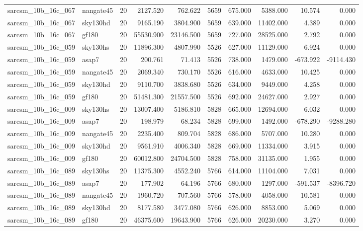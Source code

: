\begin{tabular}{llrrrrrrrr}
sarcsm\_10b\_16c\_067 & nangate45 & 20 & 2127.520 & 762.622 & 5659 & 675.000 & 5388.000 & 10.574 & 0.000 \\
sarcsm\_10b\_16c\_067 & sky130hd & 20 & 9165.190 & 3804.900 & 5659 & 639.000 & 11402.000 & 4.389 & 0.000 \\
sarcsm\_10b\_16c\_067 & gf180 & 20 & 55530.900 & 23146.500 & 5659 & 727.000 & 28525.000 & 2.792 & 0.000 \\
sarcsm\_10b\_16c\_059 & sky130hs & 20 & 11896.300 & 4807.990 & 5526 & 627.000 & 11129.000 & 6.924 & 0.000 \\
sarcsm\_10b\_16c\_059 & asap7 & 20 & 200.761 & 71.413 & 5526 & 738.000 & 1479.000 & -673.922 & -9114.430 \\
sarcsm\_10b\_16c\_059 & nangate45 & 20 & 2069.340 & 730.170 & 5526 & 616.000 & 4633.000 & 10.425 & 0.000 \\
sarcsm\_10b\_16c\_059 & sky130hd & 20 & 9110.700 & 3838.680 & 5526 & 634.000 & 9449.000 & 4.258 & 0.000 \\
sarcsm\_10b\_16c\_059 & gf180 & 20 & 51481.300 & 21557.500 & 5526 & 692.000 & 24627.000 & 2.927 & 0.000 \\
sarcsm\_10b\_16c\_009 & sky130hs & 20 & 13007.400 & 5186.810 & 5828 & 665.000 & 12694.000 & 6.032 & 0.000 \\
sarcsm\_10b\_16c\_009 & asap7 & 20 & 198.979 & 68.234 & 5828 & 699.000 & 1492.000 & -678.290 & -9288.280 \\
sarcsm\_10b\_16c\_009 & nangate45 & 20 & 2235.400 & 809.704 & 5828 & 686.000 & 5707.000 & 10.280 & 0.000 \\
sarcsm\_10b\_16c\_009 & sky130hd & 20 & 9561.910 & 4006.340 & 5828 & 669.000 & 11334.000 & 3.915 & 0.000 \\
sarcsm\_10b\_16c\_009 & gf180 & 20 & 60012.800 & 24704.500 & 5828 & 758.000 & 31135.000 & 1.955 & 0.000 \\
sarcsm\_10b\_16c\_089 & sky130hs & 20 & 11375.300 & 4552.240 & 5766 & 614.000 & 11104.000 & 7.031 & 0.000 \\
sarcsm\_10b\_16c\_089 & asap7 & 20 & 177.902 & 64.196 & 5766 & 680.000 & 1297.000 & -591.537 & -8396.720 \\
sarcsm\_10b\_16c\_089 & nangate45 & 20 & 1960.720 & 707.560 & 5766 & 578.000 & 4058.000 & 10.581 & 0.000 \\
sarcsm\_10b\_16c\_089 & sky130hd & 20 & 8177.580 & 3477.080 & 5766 & 626.000 & 8853.000 & 5.069 & 0.000 \\
sarcsm\_10b\_16c\_089 & gf180 & 20 & 46375.600 & 19643.900 & 5766 & 626.000 & 20230.000 & 3.270 & 0.000 \\

\end{tabular}
